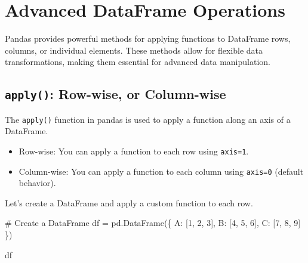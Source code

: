 \documentclass[
  letterpaper,
  DIV=11,
  numbers=noendperiod]{scrreprt}
\newenvironment{Shaded}{\begin{snugshade}}{\end{snugshade}}
\newcommand{\CommentTok}[1]{\textcolor[rgb]{0.37,0.37,0.37}{#1}}
\newcommand{\DecValTok}[1]{\textcolor[rgb]{0.68,0.00,0.00}{#1}}
\newcommand{\NormalTok}[1]{\textcolor[rgb]{0.00,0.23,0.31}{#1}}
\newcommand{\OperatorTok}[1]{\textcolor[rgb]{0.37,0.37,0.37}{#1}}
\newcommand{\StringTok}[1]{\textcolor[rgb]{0.13,0.47,0.30}{#1}}
\providecommand{\tightlist}{%
  \setlength{\itemsep}{0pt}\setlength{\parskip}{0pt}}\usepackage{longtable,booktabs,array}
\begin{document}
\hypertarget{advanced-dataframe-operations}{%
\section{Advanced DataFrame
Operations}\label{advanced-dataframe-operations}}

Pandas provides powerful methods for applying functions to DataFrame
rows, columns, or individual elements. These methods allow for flexible
data transformations, making them essential for advanced data
manipulation.

\hypertarget{apply-row-wise-or-column-wise}{%
\subsection{\texorpdfstring{\texttt{apply()}: Row-wise, or
Column-wise}{apply(): Row-wise, or Column-wise}}\label{apply-row-wise-or-column-wise}}

The \texttt{apply()} function in pandas is used to apply a function
along an axis of a DataFrame.

\begin{itemize}
\tightlist
\item
  Row-wise: You can apply a function to each row using \texttt{axis=1}.
\item
  Column-wise: You can apply a function to each column using
  \texttt{axis=0} (default behavior).
\end{itemize}

Let's create a DataFrame and apply a custom function to each row.

\begin{Shaded}
\begin{Highlighting}[]
\CommentTok{\# Create a DataFrame}
\NormalTok{df }\OperatorTok{=}\NormalTok{ pd.DataFrame(\{}
    \StringTok{\textquotesingle{}A\textquotesingle{}}\NormalTok{: [}\DecValTok{1}\NormalTok{, }\DecValTok{2}\NormalTok{, }\DecValTok{3}\NormalTok{],}
    \StringTok{\textquotesingle{}B\textquotesingle{}}\NormalTok{: [}\DecValTok{4}\NormalTok{, }\DecValTok{5}\NormalTok{, }\DecValTok{6}\NormalTok{],}
    \StringTok{\textquotesingle{}C\textquotesingle{}}\NormalTok{: [}\DecValTok{7}\NormalTok{, }\DecValTok{8}\NormalTok{, }\DecValTok{9}\NormalTok{]}
\NormalTok{\})}
\end{Highlighting}
\end{Shaded}

\begin{Shaded}
\begin{Highlighting}[]
\NormalTok{df}
\end{Highlighting}
\end{Shaded}
\end{document}
